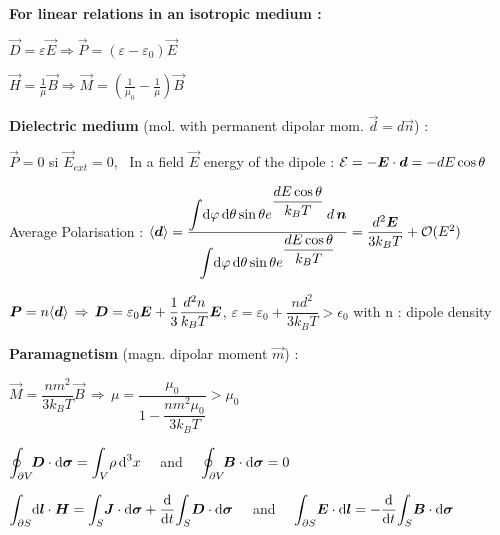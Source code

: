 \item[] \textbf{For linear relations in an isotropic medium :}
\item $\vec{D}=\varepsilon\vec{E}\Rightarrow\vec{P}=(\varepsilon-\varepsilon_0)\vec{E} \quad$ 

\item $\vec{H} = \frac{1}{\mu}\vec{B} \Rightarrow \vec{M} =  \left(\frac{1}{\mu_0} - \frac{1}{\mu}\right) \vec{B}$

\item[] \textbf{Dielectric medium} (mol. with permanent dipolar mom. $\vec{d} = d\vec{n}$) :

\item $\vec{P} = 0$ si $\vec{E}_{ext} =0$, \, In a field $\vec{E}$ energy of the dipole : $\mathcal{E} = -\mbox{\boldmath$E$}\cdot\mbox{\boldmath$d$} = - dE\cos\theta$\\

\item Average Polarisation : $\langle\mbox{\boldmath$d$}\rangle = \dfrac{\displaystyle{\int} \textrm{d} \varphi \, \textrm{d} \theta \sin\theta e^{\dfrac{d E \cos\theta}{k_BT}}\,d \,\mbox{\boldmath$n$}}{\displaystyle{\int} \textrm{d} \varphi \, \textrm{d} \theta \sin\theta e^{\dfrac{d E \cos\theta}{k_B T}}} = \dfrac{d^2 \mbox{\boldmath$E$}}{3k_BT} + \mathcal{O}(E^2) $

\item $\mbox{\boldmath$P$} = n\langle\mbox{\boldmath$d$}\rangle \, \Rightarrow \, \mbox{\boldmath$D$} = \varepsilon_0 \mbox{\boldmath$E$} + \dfrac{1}{3} \dfrac{d^2 n}{k_B T}\mbox{\boldmath$E$}$, $\varepsilon = \varepsilon_0 + \dfrac{nd^2}{3k_B T} > \epsilon_0$ with n : dipole density


\item[] \textbf{Paramagnetism} (magn. dipolar moment $\vec{m}$) :

\item $\vec{M} = \dfrac{ n m^2}{3k_B T} \vec{B} \, \Rightarrow \, \mu = \dfrac{\mu_0}{1-\dfrac{nm^2\mu_0}{3k_BT}} > \mu_0$\\
\squishend
{}
\squishlist
\item $\displaystyle{\oint_{\partial V}} \! \mbox{\boldmath$D$}\cdot\mbox{\boldmath$\textrm{d} \sigma$} = \displaystyle{\int_V} \rho \, \textrm{d} ^3x \quad$ and $\quad \displaystyle{\oint_{\partial V}} \! \mbox{\boldmath$B$}\cdot\mbox{\boldmath$\textrm{d} \sigma$} = 0$

\item $\displaystyle{\int_{\partial S}} \mbox{\boldmath$\textrm{d} l$}\cdot\mbox{\boldmath$H$} = \displaystyle{\int_S} \mbox{\boldmath$J$}\cdot\mbox{\boldmath$\textrm{d} \sigma$} + \frac{\textrm{d} }{\textrm{d} t} \displaystyle{\int_S} \mbox{\boldmath$D$}\cdot\mbox{\boldmath$\textrm{d} \sigma$} \quad $ and  $\quad \displaystyle{\int_{\partial S }} \mbox{\boldmath$E$} \cdot \mbox{\boldmath$\textrm{d} l$} = -\frac{\textrm{d} }{\textrm{d} t} \displaystyle{\int_S} \mbox{\boldmath$B$} \cdot \mbox{\boldmath$\textrm{d} \sigma$}$

